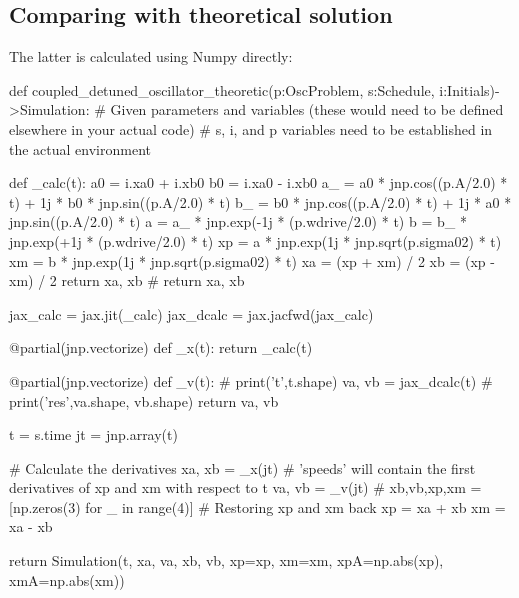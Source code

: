 \subsection{Comparing with theoretical solution}

The latter is calculated using Numpy directly:

  \begin{python}
  def coupled_detuned_oscillator_theoretic(p:OscProblem, s:Schedule, i:Initials)->Simulation:
    # Given parameters and variables (these would need to be defined elsewhere in your actual code)
    # s, i, and p variables need to be established in the actual environment
  
    def _calc(t):
      a0 = i.xa0 + i.xb0
      b0 = i.xa0 - i.xb0
      a_ = a0 * jnp.cos((p.A/2.0) * t) + 1j * b0 * jnp.sin((p.A/2.0) * t)
      b_ = b0 * jnp.cos((p.A/2.0) * t) + 1j * a0 * jnp.sin((p.A/2.0) * t)
      a = a_ * jnp.exp(-1j * (p.wdrive/2.0) * t)
      b = b_ * jnp.exp(+1j * (p.wdrive/2.0) * t)
      xp = a * jnp.exp(1j * jnp.sqrt(p.sigma02) * t)
      xm = b * jnp.exp(1j * jnp.sqrt(p.sigma02) * t)
      xa = (xp + xm) / 2
      xb = (xp - xm) / 2
      return xa, xb
      # return xa, xb
  
    jax_calc = jax.jit(_calc)
    jax_dcalc = jax.jacfwd(jax_calc)
  
    @partial(jnp.vectorize)
    def _x(t):
      return _calc(t)
  
    @partial(jnp.vectorize)
    def _v(t):
      # print('t',t.shape)
      va, vb = jax_dcalc(t)
      # print('res',va.shape, vb.shape)
      return va, vb
  
    t = s.time
    jt = jnp.array(t)
  
    # Calculate the derivatives
    xa, xb = _x(jt)
    # 'speeds' will contain the first derivatives of xp and xm with respect to t
    va, vb = _v(jt)
    # xb,vb,xp,xm = [np.zeros(3) for _ in range(4)]
    # Restoring xp and xm back
    xp = xa + xb
    xm = xa - xb
  
    return Simulation(t, xa, va, xb, vb,
                      xp=xp, xm=xm,
                      xpA=np.abs(xp), xmA=np.abs(xm))
  \end{python}


